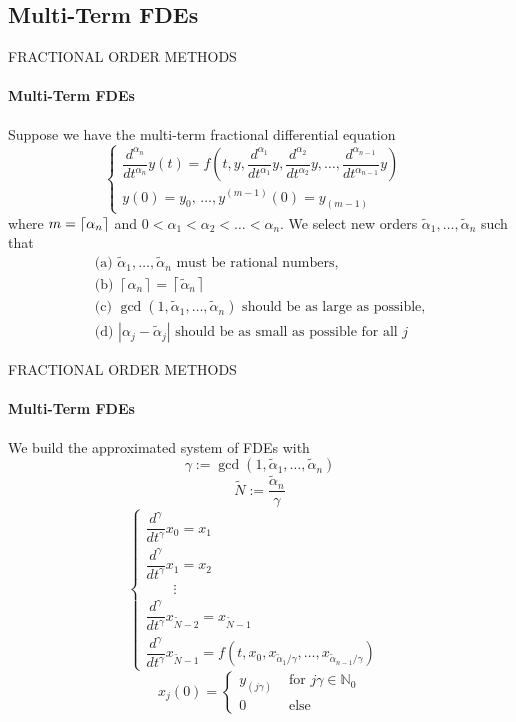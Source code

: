 \subsection{Multi-Term FDEs}
\begin{frame}{FRACTIONAL ORDER METHODS}
\framesubtitle{Multi-Term FDEs}
Suppose we have the multi-term fractional differential equation
\begin{equation}
    \begin{cases}
    \dfrac{d^{\alpha_n}}{dt^{\alpha_n}}y(t)=f\left(t,y,\dfrac{d^{\alpha_{1}}}{dt^{\alpha_{1}}}y,\dfrac{d^{\alpha_{2}}}{dt^{\alpha_{2}}}y,\dots,\dfrac{d^{\alpha_{n-1}}}{dt^{\alpha_{n-1}}}y\right)&\\
    y(0)=y_0,\,\dots,y^{(m-1)}(0)= y_{(m-1)}
    \end{cases}
\end{equation}
    where $m=\lceil\alpha_n\rceil$ and $0<\alpha_{1}<\alpha_{2}<\ldots<\alpha_{n}$. We select new orders $\tilde{\alpha}_{1}, \ldots, \tilde{\alpha}_{n}$ such that
    \[\begin{array}{l}{\text { (a) } \tilde{\alpha}_{1}, \ldots, \tilde{\alpha}_{n} \text { must be rational numbers, }} \\ {\text { (b) }\left\lceil\alpha_{n}\right\rceil=\left\lceil\tilde{\alpha}_{n}\right\rceil} \\ {\text { (c) } \operatorname{gcd}\left(1, \tilde{\alpha}_{1}, \ldots, \tilde{\alpha}_{n}\right) \text { should be as large as possible, }} \\ {\text { (d) }\left|\alpha_{j}-\tilde{\alpha}_{j}\right| \text { should be as small as possible for all } j}\end{array}\]
\end{frame}


\begin{frame}{FRACTIONAL ORDER METHODS}
\framesubtitle{Multi-Term FDEs}
    We build the approximated system of FDEs with \[\gamma :=\operatorname{gcd}\left(1, \tilde{\alpha}_{1}, \ldots, \tilde{\alpha}_{n}\right)\] 
    \[\tilde{N} :=\frac{\tilde{\alpha}_{n}}{\gamma}\]
    \begin{equation}
    \begin{cases}
    \dfrac{d^{\gamma}}{dt^\gamma} x_{0} =x_{1} &\\[5pt]
    \dfrac{d^{\gamma}}{dt^\gamma} x_{1} =x_{2} &\\
    \qquad\vdots &\\
    \dfrac{d^{\gamma}}{dt^\gamma} x_{\tilde{N}-2} =x_{\tilde{N}-1} &\\[5pt]
    \dfrac{d^{\gamma}}{dt^\gamma} x_{\tilde{N}-1} =f\left(t, x_{0}, x_{\tilde{\alpha}_{1} / \gamma}, \ldots, x_{\tilde{\alpha}_{n-1} / \gamma}\right) \end{cases}
    \end{equation}
    \begin{equation}
    x _ { j } ( 0 ) = \begin{cases} { y _ { ( j \gamma ) }   } & { \text { for } j \gamma \in \mathbb { N } _ { 0 } } \\ { 0  } & { \text { else } } \end{cases}
    \end{equation}
\end{frame}

